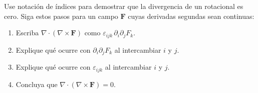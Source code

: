 Use notación de índices para demostrar que la divergencia de un rotacional es cero. Siga estos pasos para un campo $\mathbf{F}$ cuyas derivadas segundas sean continuas:
\begin{enumerate}
    \item Escriba $\nabla\cdot(\nabla\times\mathbf{F})$ como $\varepsilon_{ijk}\,\partial_i\partial_jF_k$.
    \item Explique qué ocurre con $\partial_i\partial_jF_k$ al intercambiar $i$ y $j$.
    \item Explique qué ocurre con $\varepsilon_{ijk}$ al intercambiar $i$ y $j$.
    \item Concluya que $\nabla\cdot(\nabla\times\mathbf{F})=0$.
\end{enumerate}
